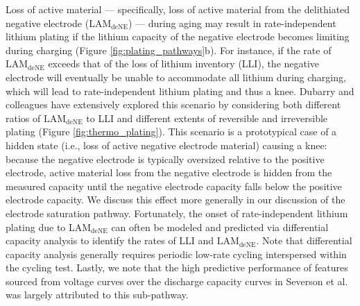 \documentclass[journal=jpclcd,manuscript=article]{achemso}
\begin{document}
Loss of active material --- specifically, loss of active material from the delithiated negative electrode ($\mathrm{LAM_{deNE}}$) --- during aging may result in rate-independent lithium plating if the lithium capacity of the negative electrode becomes limiting during charging (Figure \ref{fig:plating_pathways}b). For instance, if the rate of $\mathrm{LAM_{deNE}}$ exceeds that of the loss of lithium inventory (LLI), the negative electrode will eventually be unable to accommodate all lithium during charging, which will lead to rate-independent lithium plating and thus a knee. Dubarry and colleagues\cite{ansean_operando_2017, dubarry_durability_2018, baure_synthetic_2019, dubarry_big_2020} have extensively explored this scenario by considering both different ratios of $\mathrm{LAM_{deNE}}$ to LLI and different extents of reversible and irreversible plating (Figure \ref{fig:thermo_plating}). This scenario is a prototypical case of a hidden state (i.e., loss of active negative electrode material) causing a knee: because the negative electrode is typically oversized relative to the positive electrode, active material loss from the negative electrode is hidden from the measured capacity until the negative electrode capacity falls below the positive electrode capacity. We discuss this effect more generally in our discussion of the electrode saturation pathway. Fortunately, the onset of rate-independent lithium plating due to $\mathrm{LAM_{deNE}}$ can often be modeled and predicted via differential capacity analysis\cite{ansean_operando_2017, dubarry_durability_2018, baure_synthetic_2019, dubarry_big_2020} to identify the rates of LLI and $\mathrm{LAM_{deNE}}$. Note that differential capacity analysis generally requires periodic low-rate cycling interspersed within the cycling test.
Lastly, we note that the high predictive performance of features sourced from voltage curves over the discharge capacity curves in Severson et al.\cite{severson_data-driven_2019} was largely attributed to this sub-pathway.
\end{document}
